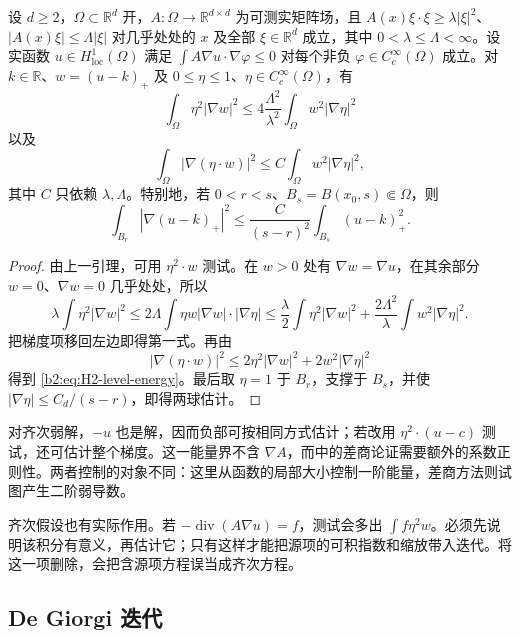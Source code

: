 \begin{proposition}
\label{b2:prop:H2-level-caccioppoli}
设 \(d\geq2\)，\(\Omega\subset\mathbb R^d\) 开，\(A:\Omega\to\mathbb R^{d\times d}\) 为可测实矩阵场，且
\(A(x)\xi\cdot\xi\geq\lambda|\xi|^2\)、\(|A(x)\xi|\leq\Lambda|\xi|\) 对几乎处处的 \(x\) 及全部 \(\xi\in\mathbb R^d\) 成立，其中 \(0<\lambda\leq\Lambda<\infty\)。设实函数 \(u\in H^1_{\mathrm{loc}}(\Omega)\) 满足
\(\int A\nabla u\cdot\nabla\varphi\leq0\) 对每个非负 \(\varphi\in C_c^\infty(\Omega)\) 成立。对 \(k\in\mathbb R\)、\(w=(u-k)_+\) 及 \(0\leq\eta\leq1\)、\(\eta\in C_c^\infty(\Omega)\)，有
\[
 \int_\Omega\eta^2|\nabla w|^2
 \leq4\frac{\Lambda^2}{\lambda^2}
          \int_\Omega w^2|\nabla\eta|^2
\]
以及
\begin{equation}\label{b2:eq:H2-level-energy}
 \int_\Omega|\nabla(\eta\cdot w)|^2
 \leq C\int_\Omega w^2|\nabla\eta|^2,
\end{equation}
其中 \(C\) 只依赖 \(\lambda,\Lambda\)。特别地，若
\(0<r<s\)、\(B_s=B(x_0,s)\Subset\Omega\)，则
\[
 \int_{B_r}|\nabla(u-k)_+|^2
 \leq\frac{C}{(s-r)^2}\int_{B_s}(u-k)_+^2.
\]
\end{proposition}
\begin{proof}
由上一引理，可用 \(\eta^2\cdot w\) 测试。在 \(w>0\) 处有 \(\nabla w=\nabla u\)，在其余部分 \(w=0\)、\(\nabla w=0\) 几乎处处，所以
\[
 \lambda\int\eta^2|\nabla w|^2
 \leq2\Lambda\int\eta w|\nabla w|\cdot|\nabla\eta|
 \leq\frac\lambda2\int\eta^2|\nabla w|^2
       +\frac{2\Lambda^2}{\lambda}\int w^2|\nabla\eta|^2.
\]
把梯度项移回左边即得第一式。再由
\[
 |\nabla(\eta\cdot w)|^2
 \leq2\eta^2|\nabla w|^2+2w^2|\nabla\eta|^2
\]
得到 \eqref{b2:eq:H2-level-energy}。最后取 \(\eta=1\) 于 \(B_r\)，支撑于 \(B_s\)，并使 \(|\nabla\eta|\leq C_d/(s-r)\)，即得两球估计。
\end{proof}

对齐次弱解，\(-u\) 也是解，因而负部可按相同方式估计；若改用 \(\eta^2\cdot(u-c)\) 测试，还可估计整个梯度。这一能量界不含 \(\nabla A\)，而中的差商论证需要额外的系数正则性。两者控制的对象不同：这里从函数的局部大小控制一阶能量，差商方法则试图产生二阶弱导数。

\ProseParagraphBreak

齐次假设也有实际作用。若 \(-\operatorname{div}(A\nabla u)=f\)，测试会多出 \(\int f\eta^2w\)。必须先说明该积分有意义，再估计它；只有这样才能把源项的可积指数和缩放带入迭代。将这一项删除，会把含源项方程误当成齐次方程。

\subsection{De Giorgi 迭代}
\label{b2:subsec:H20102}

